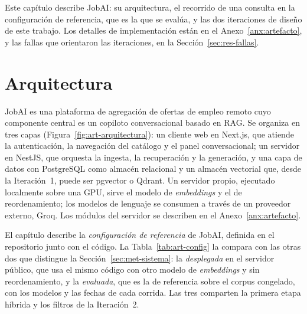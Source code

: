 Este capítulo describe JobAI: su arquitectura, el recorrido de una consulta en la configuración de referencia, que es la que se evalúa, y las dos iteraciones de diseño de este trabajo. Los detalles de implementación están en el Anexo~\ref{anx:artefacto}, y las fallas que orientaron las iteraciones, en la Sección~\ref{sec:res-fallas}.

\section{Arquitectura}
\label{sec:art-arquitectura}

JobAI es una plataforma de agregación de ofertas de empleo remoto cuyo componente central es un copiloto conversacional basado en RAG. Se organiza en tres capas (Figura~\ref{fig:art-arquitectura}): un cliente web en Next.js, que atiende la autenticación, la navegación del catálogo y el panel conversacional; un servidor en NestJS, que orquesta la ingesta, la recuperación y la generación, y una capa de datos con PostgreSQL como almacén relacional y un almacén vectorial que, desde la Iteración~1, puede ser pgvector o Qdrant. Un servidor propio, ejecutado localmente sobre una GPU, sirve el modelo de \textit{embeddings} y el de reordenamiento; los modelos de lenguaje se consumen a través de un proveedor externo, Groq. Los módulos del servidor se describen en el Anexo~\ref{anx:artefacto}.

El capítulo describe la \emph{configuración de referencia} de JobAI, definida en el repositorio junto con el código. La Tabla~\ref{tab:art-config} la compara con las otras dos que distingue la Sección~\ref{sec:met-sistema}: la \emph{desplegada} en el servidor público, que usa el mismo código con otro modelo de \textit{embeddings} y sin reordenamiento, y la \emph{evaluada}, que es la de referencia sobre el corpus congelado, con los modelos y las fechas de cada corrida. Las tres comparten la primera etapa híbrida y los filtros de la Iteración~2.

